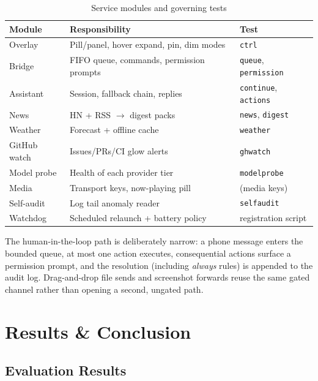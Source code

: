 \documentclass[conference]{IEEEtran}
\begin{document}
\begin{table}[t]
\centering\small
\caption{Service modules and governing tests}\label{tab:modules}
\begin{tabular}{@{}p{}p{}p{}@{}}
\toprule
\textbf{Module} & \textbf{Responsibility} & \textbf{Test} \\
\midrule
Overlay & Pill/panel, hover expand, pin, dim modes & \texttt{ctrl} \\
Bridge & FIFO queue, commands, permission prompts & \texttt{queue}, \texttt{permission} \\
Assistant & Session, fallback chain, replies & \texttt{continue}, \texttt{actions} \\
News & HN + RSS $\rightarrow$ digest packs & \texttt{news}, \texttt{digest} \\
Weather & Forecast + offline cache & \texttt{weather} \\
GitHub watch & Issues/PRs/CI glow alerts & \texttt{ghwatch} \\
Model probe & Health of each provider tier & \texttt{modelprobe} \\
Media & Transport keys, now-playing pill & (media keys) \\
Self-audit & Log tail anomaly reader & \texttt{selfaudit} \\
Watchdog & Scheduled relaunch + battery policy & registration script \\
\bottomrule
\end{tabular}
\end{table}

The human-in-the-loop path is deliberately narrow: a phone
message enters the bounded queue, at most one action executes,
consequential actions surface a permission prompt, and the
resolution (including \emph{always} rules) is appended to the
audit log. Drag-and-drop file sends and screenshot forwards
reuse the same gated channel rather than opening a second,
ungated path.


\section{Results \& Conclusion}

\subsection{Evaluation Results}
\end{document}
